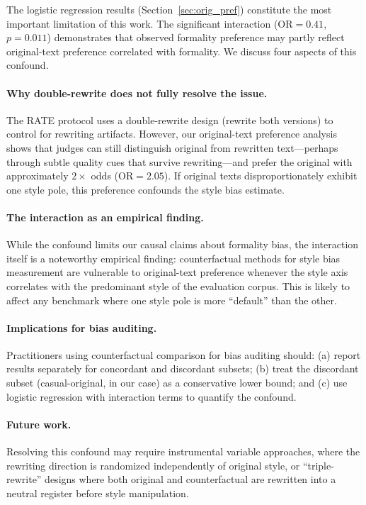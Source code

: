 \documentclass[11pt,a4paper]{article}
\begin{document}
The logistic regression results (Section~\ref{sec:orig_pref}) constitute the most important limitation of this work.
The significant interaction (OR$=0.41$, $p=0.011$) demonstrates that observed formality preference may partly reflect original-text preference correlated with formality.
We discuss four aspects of this confound.

\paragraph{Why double-rewrite does not fully resolve the issue.}
The RATE protocol uses a double-rewrite design (rewrite both versions) to control for rewriting artifacts.
However, our original-text preference analysis shows that judges can still distinguish original from rewritten text---perhaps through subtle quality cues that survive rewriting---and prefer the original with approximately $2\times$ odds (OR$=2.05$).
If original texts disproportionately exhibit one style pole, this preference confounds the style bias estimate.

\paragraph{The interaction as an empirical finding.}
While the confound limits our causal claims about formality bias, the interaction itself is a noteworthy empirical finding: counterfactual methods for style bias measurement are vulnerable to original-text preference whenever the style axis correlates with the predominant style of the evaluation corpus.
This is likely to affect any benchmark where one style pole is more ``default'' than the other.

\paragraph{Implications for bias auditing.}
Practitioners using counterfactual comparison for bias auditing should: (a) report results separately for concordant and discordant subsets; (b) treat the discordant subset (casual-original, in our case) as a conservative lower bound; and (c) use logistic regression with interaction terms to quantify the confound.

\paragraph{Future work.}
Resolving this confound may require instrumental variable approaches, where the rewriting direction is randomized independently of original style, or ``triple-rewrite'' designs where both original and counterfactual are rewritten into a neutral register before style manipulation.
\end{document}
